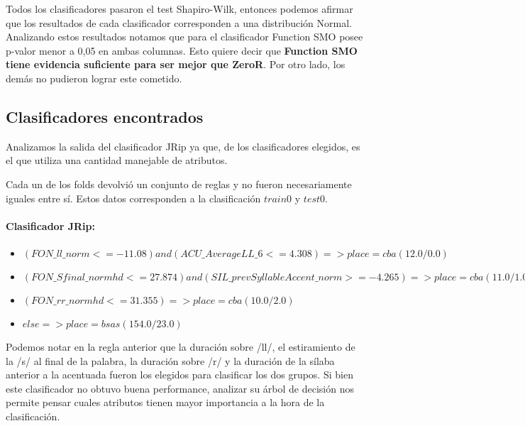 Todos los clasificadores pasaron el test Shapiro-Wilk, entonces podemos afirmar que los resultados de cada clasificador corresponden a una distribución Normal. Analizando estos resultados notamos que para el clasificador Function SMO posee p-valor menor a 0,05 en ambas columnas. Esto quiere decir que \textbf{Function SMO tiene evidencia suficiente para ser mejor que ZeroR}. Por otro lado, los demás no pudieron lograr este cometido. 

\subsection{Clasificadores encontrados}

Analizamos la salida del clasificador JRip ya que, de los clasificadores elegidos, es el que utiliza una cantidad manejable de atributos. 

Cada un de los folds devolvió un conjunto de reglas y no fueron necesariamente iguales entre sí. Estos datos corresponden a la clasificación $train 0$ y $test 0$.

\paragraph*{Clasificador JRip:}

\begin{flushleft}
\begin{itemize}

\item $(FON\_ll\_norm <= -11.08) and (ACU\_AverageLL\_6 <= 4.308) => place=cba (12.0/0.0)$ \\
\item $(FON\_Sfinal\_normhd <= 27.874) and (SIL\_prevSyllableAccent\_norm >= -4.265) => place=cba (11.0/1.0)$ \\
\item $(FON\_rr\_normhd <= 31.355) => place=cba (10.0/2.0)$ \\
\item $ else  => place=bsas (154.0/23.0)$
\end{itemize}
\end{flushleft}

Podemos notar en la regla anterior que la duración sobre /ll/, el estiramiento de la /s/ al final de la palabra, la duración sobre /r/ y la duración de la sílaba anterior a la acentuada fueron los elegidos para clasificar los dos grupos. Si bien este clasificador no obtuvo buena performance, analizar su árbol de decisión nos permite pensar cuales atributos tienen mayor importancia a la hora de la clasificación.

